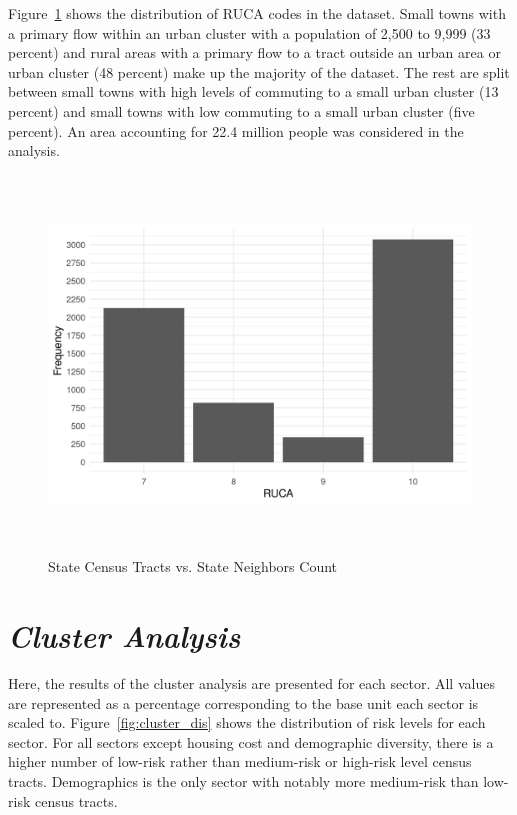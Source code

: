 Figure~\ref{fig:ruca_frequency} shows the distribution of RUCA codes in the dataset. Small towns with a primary flow within an urban cluster with a population of 2,500 to 9,999 (33 percent) and rural areas with a primary flow to a tract outside an urban area or urban cluster (48 percent) make up the majority of the dataset. The rest are split between small towns with high levels of commuting to a small urban cluster (13 percent) and small towns with low commuting to a small urban cluster  (five percent). An area accounting for 22.4 million people was considered in the analysis. 

\begin{figure}[htbp]
    \centering
     \includegraphics[width=1\textwidth, height=10cm]{plots/ruca_frequency.png}
     \caption{State Census Tracts vs. State Neighbors Count}
     \label{fig:ruca_frequency}
 \end{figure}
 

\section{\textit{Cluster Analysis}}

Here, the results of the cluster analysis are presented for each sector. All values are represented as a percentage corresponding to the base unit each sector is scaled to. Figure~\ref{fig:cluster_dis} shows the distribution of risk levels for each sector. For all sectors except housing cost and demographic diversity, there is a higher number of low-risk rather than medium-risk or high-risk level census tracts. Demographics is the only sector with notably more medium-risk than low-risk census tracts. 


